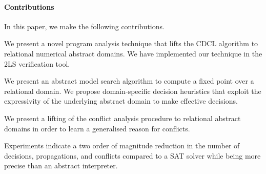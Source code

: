 \paragraph{Contributions}
In this paper, we make the following contributions.
\begin{compactenum}
\item We present a novel program analysis technique that 
lifts the CDCL algorithm to relational numerical abstract domains.   
We have implemented our technique in the 2LS verification tool.  

\item We present an abstract model search algorithm 
to compute a fixed point over a relational domain.  We propose 
domain-specific decision heuristics that exploit the expressivity 
of the underlying abstract domain to make effective decisions. 

\item We present a lifting of the conflict analysis procedure 
to relational abstract domains in order to learn a generalised reason 
for conflicts.  
 
\item  Experiments indicate a two order of magnitude reduction 
in the number of decisions, propagations, and conflicts compared 
to a SAT solver while being more precise than an abstract interpreter.  
\end{compactenum}
